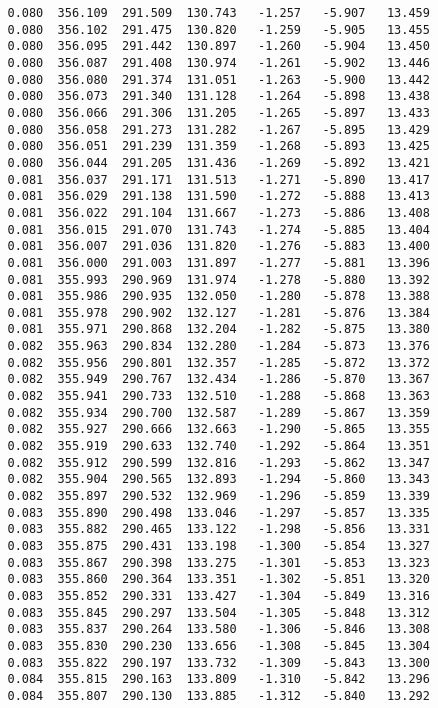 \begin{verbatim}
   0.080  356.109  291.509  130.743   -1.257   -5.907   13.459
   0.080  356.102  291.475  130.820   -1.259   -5.905   13.455
   0.080  356.095  291.442  130.897   -1.260   -5.904   13.450
   0.080  356.087  291.408  130.974   -1.261   -5.902   13.446
   0.080  356.080  291.374  131.051   -1.263   -5.900   13.442
   0.080  356.073  291.340  131.128   -1.264   -5.898   13.438
   0.080  356.066  291.306  131.205   -1.265   -5.897   13.433
   0.080  356.058  291.273  131.282   -1.267   -5.895   13.429
   0.080  356.051  291.239  131.359   -1.268   -5.893   13.425
   0.080  356.044  291.205  131.436   -1.269   -5.892   13.421
   0.081  356.037  291.171  131.513   -1.271   -5.890   13.417
   0.081  356.029  291.138  131.590   -1.272   -5.888   13.413
   0.081  356.022  291.104  131.667   -1.273   -5.886   13.408
   0.081  356.015  291.070  131.743   -1.274   -5.885   13.404
   0.081  356.007  291.036  131.820   -1.276   -5.883   13.400
   0.081  356.000  291.003  131.897   -1.277   -5.881   13.396
   0.081  355.993  290.969  131.974   -1.278   -5.880   13.392
   0.081  355.986  290.935  132.050   -1.280   -5.878   13.388
   0.081  355.978  290.902  132.127   -1.281   -5.876   13.384
   0.081  355.971  290.868  132.204   -1.282   -5.875   13.380
   0.082  355.963  290.834  132.280   -1.284   -5.873   13.376
   0.082  355.956  290.801  132.357   -1.285   -5.872   13.372
   0.082  355.949  290.767  132.434   -1.286   -5.870   13.367
   0.082  355.941  290.733  132.510   -1.288   -5.868   13.363
   0.082  355.934  290.700  132.587   -1.289   -5.867   13.359
   0.082  355.927  290.666  132.663   -1.290   -5.865   13.355
   0.082  355.919  290.633  132.740   -1.292   -5.864   13.351
   0.082  355.912  290.599  132.816   -1.293   -5.862   13.347
   0.082  355.904  290.565  132.893   -1.294   -5.860   13.343
   0.082  355.897  290.532  132.969   -1.296   -5.859   13.339
   0.083  355.890  290.498  133.046   -1.297   -5.857   13.335
   0.083  355.882  290.465  133.122   -1.298   -5.856   13.331
   0.083  355.875  290.431  133.198   -1.300   -5.854   13.327
   0.083  355.867  290.398  133.275   -1.301   -5.853   13.323
   0.083  355.860  290.364  133.351   -1.302   -5.851   13.320
   0.083  355.852  290.331  133.427   -1.304   -5.849   13.316
   0.083  355.845  290.297  133.504   -1.305   -5.848   13.312
   0.083  355.837  290.264  133.580   -1.306   -5.846   13.308
   0.083  355.830  290.230  133.656   -1.308   -5.845   13.304
   0.083  355.822  290.197  133.732   -1.309   -5.843   13.300
   0.084  355.815  290.163  133.809   -1.310   -5.842   13.296
   0.084  355.807  290.130  133.885   -1.312   -5.840   13.292

\end{verbatim}
